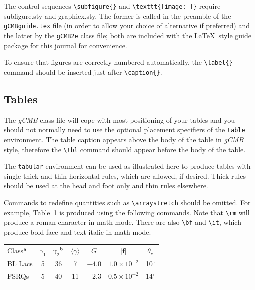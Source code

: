 \documentclass{gCMB2e}
\begin{document}
The control sequences \verb"\subfigure{}" and \verb"\texttt{[image: ]}" require subfigure.sty and graphicx.sty.
The former is called in the preamble of the \texttt{gCMBguide.tex} file (in order to allow your choice of alternative if preferred)
and the latter by the \texttt{gCMB2e} class file; both are included with the \LaTeX\ style guide package for this journal for convenience.

To ensure that figures are correctly numbered automatically, the \verb"\label{}" command should be inserted just
after \verb"\caption{}".


\subsection{Tables}

The \textit{gCMB} class file will cope with most positioning of your tables and you should not normally need to use the optional
placement specifiers of the \texttt{table} environment. The table caption appears above the body of the table in {\it gCMB} style, 
therefore the \verb"\tbl" command should appear before the body of the table.

The {\tt tabular} environment can be used as illustrated here to produce tables with single thick and thin horizontal rules, which
are allowed, if desired. Thick rules should be used at the head and foot only and thin rules elsewhere.

Commands to redefine quantities such as \verb"\arraystretch" should be omitted. For example, Table~\ref{symbols}
is produced using the following commands. Note that \verb"\rm" will produce a roman character in math mode. There
are also \verb"\bf" and \verb"\it", which produce bold face and text italic in math mode.

\begin{table}
{\begin{tabular}[l]{@{}lcccccc}\toprule
  Class$^{\rm a}$ & $\gamma _1$ & $\gamma _2$$^{\rm b}$
         & $\langle \gamma \rangle$
         & $G$ & $|{\bm f}|$ & $\theta _{c}$ \\
\colrule
  BL Lacs &5 & 36 & 7 & $-4.0$ & $1.0\times 10^{-2}$ & 10$^\circ$ \\
  FSRQs & 5 & 40 & 11 & $-2.3$ & $0.5\times 10^{-2}$ & 14$^\circ$ \\
\botrule
\end{tabular}}
\label{symbols}
\end{table}
\end{document}
